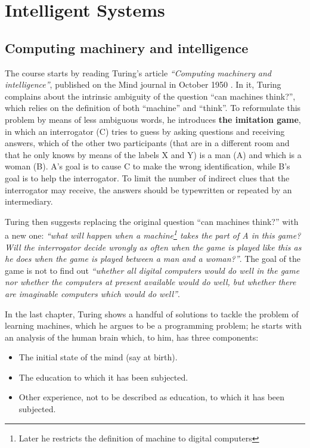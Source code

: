 \section{Intelligent Systems}
\subsection{Computing machinery and intelligence}
The course starts by reading Turing's article \textit{``Computing machinery and intelligence''}, published on the Mind journal in October 1950 \cite{10.1093/mind/LIX.236.433}. In it, Turing complains about the intrinsic ambiguity of the question ``can machines think?'', which relies on the definition of both ``machine'' and ``think''. To reformulate this problem by means of less ambiguous words, he introduces \textbf{the imitation game}, in which an interrogator (C) tries to guess by asking questions and receiving answers, which of the other two participants (that are in a different room and that he only knows by means of the labels X and Y) is a man (A) and which is a woman (B). A's goal is to cause C to make the wrong identification, while B's goal is to help the interrogator. To limit the number of indirect clues that the interrogator may receive, the answers should be typewritten or repeated by an intermediary.

Turing then suggests replacing the original question ``can machines think?'' with a new one: \textit{``what will happen when a machine\footnote{Later he restricts the definition of machine to digital computers} takes the part of A in this game? Will the interrogator decide wrongly as often when the game is played like this as he does when the game is played between a man and a woman?''}. The goal of the game is not to find out \textit{``whether all digital computers would do well in the game nor whether the computers at present available would do well, but whether there are imaginable computers which would do well''}.

In the last chapter, Turing shows a handful of solutions to tackle the problem of learning machines, which he argues to be a programming problem; he starts with an analysis of the human brain which, to him, has three components:

\begin{itemize}
    \item The initial state of the mind (say at birth).
    \item The education to which it has been subjected.
    \item Other experience, not to be described as education, to which it has been subjected.
\end{itemize}

